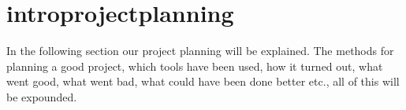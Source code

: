 \section{introprojectplanning}
In the following section our project planning will be explained. The methods for planning a good project, which tools have been used, how it turned out, what went good, what went bad, what could have been done better etc., all of this will be expounded.